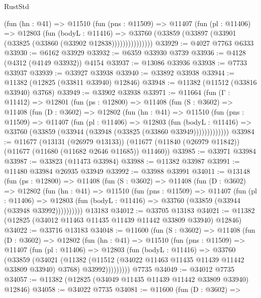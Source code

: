 \begin{lexlean}{RustStd}
\begin{coremodule}
              (fun (hn : @41) =>
              @11510
                (fun (pns : @11509) =>
                @11407
                  (fun (pl : @11406) =>
                  @12803
                    (fun (bodyL : @11416) =>
                    @33760 (@33859 (@33897 (@33901 (@33825 (@33860 (@33902 @12838)))))))))))))))
@33929 := @4027 @7763 @6333
@33930 := @6162 @33929
@33932 := @6359 @33930 @3739
@33936 := @4128 (@4312 (@4149 @33932)) @4154
@33937 := @13086 @33936
@33938 := @7733 @33937
@33939 := @33927 @33938
@33940 := @33892 @33938
@33944 := @11382 (@12825 (@33811 @33940) @12846)
@33948 := @11382 (@11512 (@33816 @33940) @3768)
@33949 := @33902 @33938
@33971 := @11664
    (fun (Γ : @11412) =>
    @12801
      (fun (ps : @12800) =>
      @11408
        (fun (S : @3602) =>
        @11408
          (fun (D : @3602) =>
          @12802
            (fun (hn : @41) =>
            @11510
              (fun (pns : @11509) =>
              @11407
                (fun (pl : @11406) =>
                @12803
                  (fun (bodyL : @11416) =>
                  @33760 (@33859 (@33944 (@33948 (@33825 (@33860 @33949)))))))))))))
@33984 := @11677
    (@13131 (@26979 @13133))
    (@11677 (@11840 (@26979 @11842)) (@11677 (@11680 (@11682 @2646 @11685)) @11460))
@33985 := @33971 @33984
@33987 := @33823 (@11473 @33984)
@33988 := @11382 @33987
@33991 := @11480 @33984 @26935 @33949
@33992 := @33988 @33991
@34011 := @13148
    (fun (ps : @12800) =>
    @11408
      (fun (S : @3602) =>
      @11408
        (fun (D : @3602) =>
        @12802
          (fun (hn : @41) =>
          @11510
            (fun (pns : @11509) =>
            @11407
              (fun (pl : @11406) =>
              @12803 (fun (bodyL : @11416) => @33760 (@33859 (@33944 (@33948 @33992))))))))))
    @13183
@34012 := @33705 @13183
@34021 := @11382 (@12825 (@34012 @11463 @11435 @11439 @11442 @33809 @33940) @12846)
@34022 := @33716 @13183
@34048 := @11600
    (fun (S : @3602) =>
    @11408
      (fun (D : @3602) =>
      @12802
        (fun (hn : @41) =>
        @11510
          (fun (pns : @11509) =>
          @11407
            (fun (pl : @11406) =>
            @12803
              (fun (bodyL : @11416) =>
              @33760
                (@33859
                  (@34021
                    (@11382
                      (@11512 (@34022 @11463 @11435 @11439 @11442 @33809 @33940) @3768)
                      @33992)))))))))
    @7735
@34049 := @34012 @7735
@34057 := @11382 (@12825 (@34049 @11435 @11439 @11442 @33809 @33940) @12846)
@34058 := @34022 @7735
@34081 := @11600
    (fun (D : @3602) =>

\end{coremodule}
\end{lexlean}
